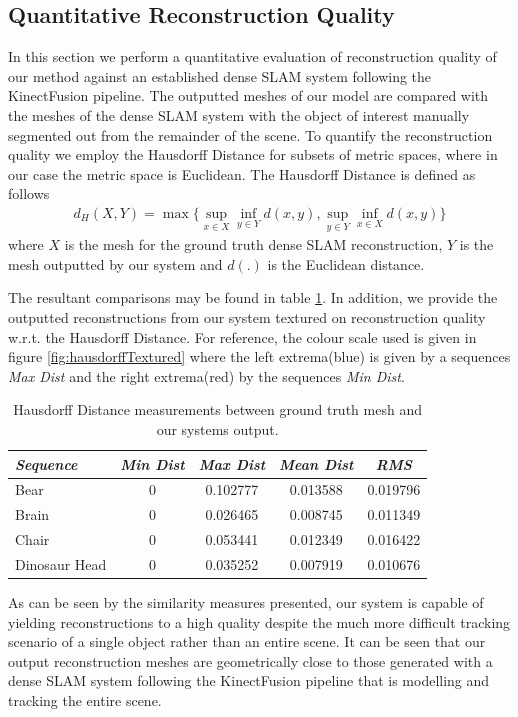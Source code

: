\subsection{Quantitative Reconstruction Quality}
In this section we perform a quantitative evaluation of reconstruction quality of our method against an established dense SLAM system \cite{Prisacariu2014} following the KinectFusion \cite{Newcombe2011} pipeline.
The outputted meshes of our model are compared with the meshes of the dense SLAM system with the object of interest manually segmented out from the remainder of the scene. To quantify the reconstruction quality 
we employ the Hausdorff Distance \cite{Hausdorff} for subsets of metric spaces, where in our case the metric space is Euclidean. The Hausdorff Distance is defined as follows
\begin{equation}
\begin{split}
d_{H}(X, Y) = \max \Bigg \{ \sup_{x \in X} \inf_{y \in Y} d(x, y), \sup_{y \in Y} \inf_{x \in X} d(x, y) \Bigg \}
\end{split}
\end{equation}
where $X$ is the mesh for the ground truth dense SLAM reconstruction, $Y$ is the mesh outputted by our system and $d(.)$ is the Euclidean distance.

The resultant comparisons may be found in table \ref{hausdorffTable}. In addition, we provide the outputted reconstructions from our system textured on reconstruction quality w.r.t. the Hausdorff Distance. 
For reference, the colour scale used is given in figure \ref{fig:hausdorffTextured} where the left extrema(blue) is given by a sequences \textit{Max Dist} and the right extrema(red) by the sequences \textit{Min Dist}. 
\begin{table}[!t]
	{
		\footnotesize
		\begin{center}
			\begin{tabular}{l c c c c}
				\emph{Sequence} & \emph{Min Dist} & \emph{Max Dist} & \emph{Mean Dist} & \emph{RMS}\\
				\midrule
				\textsf{Bear} & 0 & 0.102777 & 0.013588 & 0.019796 \\
				\textsf{Brain} & 0 & 0.026465 & 0.008745 & 0.011349 \\
				\textsf{Chair} & 0 & 0.053441 & 0.012349 & 0.016422 \\
				\textsf{Dinosaur Head} & 0 & 0.035252 & 0.007919 & 0.010676
			\end{tabular}
		\end{center}
	}
\vspace{-3mm}
	\caption{Hausdorff Distance measurements between ground truth mesh and our systems output.}
	\label{hausdorffTable}
\end{table}
As can be seen by the similarity measures presented, our system is capable of yielding reconstructions to a high quality despite the much more difficult tracking scenario of a single object rather than an entire 
scene. It can be seen that our output reconstruction meshes are geometrically close to those generated with a dense SLAM system \cite{Prisacariu2014} following the KinectFusion \cite{Newcombe2011} pipeline that 
is modelling and tracking the entire scene.


